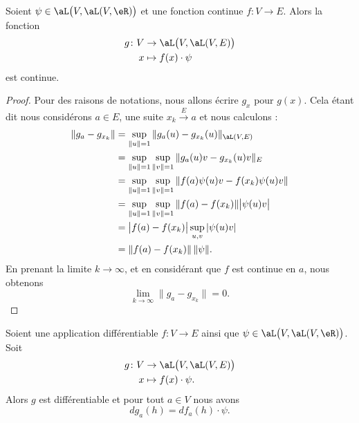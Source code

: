 \begin{lemma}
    Soient \( \psi\in\aL\big( V,\aL(V,\eR) \big)\) et une fonction continue \( f\colon V\to E\). Alors la fonction
    \begin{equation}
        \begin{aligned}
            g\colon V&\to \aL\big( V,\aL(V,E) \big) \\
            x&\mapsto f(x)\cdot \psi 
        \end{aligned}
    \end{equation}
    est continue.   
\end{lemma}

\begin{proof}
    Pour des raisons de notations, nous allons écrire \( g_x\) pour \( g(x)\). Cela étant dit nous considérons \( a\in E\), une suite \( x_k\stackrel{E}{\longrightarrow}a \) et nous calculons :
    \begin{subequations}
        \begin{align}
            \| g_a-g_{x_k} \|&=\sup_{\| u \|=1}\| g_a(u)-g_{x_k}(u) \|_{\aL(V,E)}\\
            &=\sup_{\| u \|=1}\sup_{\| v \|=1}\| g_a(u)v-g_{x_k}(u)v \|_{E}\\
            &=\sup_{\| u \|=1}\sup_{\| v \|=1}\| f(a)\psi(u)v-f(x_k)\psi(u)v \|\\
            &=\sup_{\| u \|=1}\sup_{\| v \|=1}\| f(a)-f(x_k) \|\big| \psi(u)v \big|\\
            &=\big| f(a)-f(x_k) \big|\sup_{u,v}| \psi(u)v |\\
            &=\| f(a)-f(x_k) \|\,\| \psi \|.
        \end{align}
    \end{subequations}
    En prenant la limite \( k\to \infty\), et en considérant que \( f\) est continue en \( a\), nous obtenons
    \begin{equation}
        \lim_{k\to \infty} \| g_a-g_{x_k} \|=0.
    \end{equation}
\end{proof}

\begin{lemma}
    Soient une application différentiable \( f\colon V\to E\) ainsi que \( \psi\in\aL\big( V,\aL(V,\eR) \big)\). Soit
    \begin{equation}
        \begin{aligned}
            g\colon V&\to \aL\big(V, \aL(V,E) \big) \\
            x&\mapsto f(x)\cdot \psi. 
        \end{aligned}
    \end{equation}
    Alors \( g\) est différentiable et pour tout \( a\in V\) nous avons
    \begin{equation}
        dg_a(h)=df_a(h)\cdot \psi.
    \end{equation}
\end{lemma}

